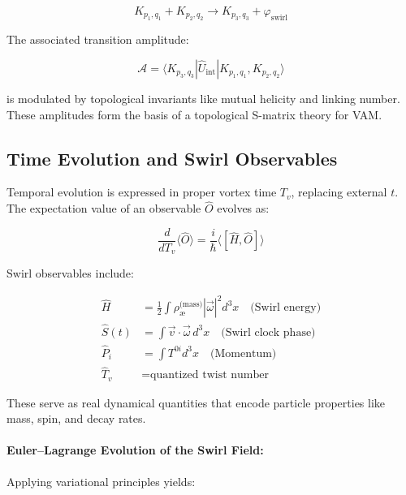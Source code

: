 \documentclass[preprint]{revtex4-2}
\begin{document}
    \begin{equation}
    K_{p_1,q_1} + K_{p_2,q_2} \rightarrow K_{p_3,q_3} + \varphi_{\text{swirl}}
    \end{equation}

    The associated transition amplitude:

    \begin{equation}
    \mathcal{A} = \langle K_{p_3,q_3} | \hat{U}_{\text{int}} | K_{p_1,q_1}, K_{p_2,q_2} \rangle
    \end{equation}

    is modulated by topological invariants like mutual helicity and linking number. These amplitudes form the basis of a topological S-matrix theory for VAM.

    \subsection{Time Evolution and Swirl Observables}

    Temporal evolution is expressed in proper vortex time \( T_v \), replacing external \( t \). The expectation value of an observable \( \hat{O} \) evolves as:

    \begin{equation}
    \frac{d}{dT_v} \langle \hat{O} \rangle = \frac{i}{\hbar} \langle [\hat{H}, \hat{O}] \rangle
    \end{equation}

    Swirl observables include:

    \begin{align}
    \hat{H} &= \frac{1}{2} \int \rho_{\text{\ae}}^{\text{(mass)}} |\vec{\omega}|^2 d^3x \quad \text{(Swirl energy)} \\
    \hat{S}(t) &= \int \vec{v} \cdot \vec{\omega} \, d^3x \quad \text{(Swirl clock phase)} \\
    \hat{P}_i &= \int T^{0i} d^3x \quad \text{(Momentum)} \\
    \hat{T}_v &= \text{quantized twist number}
    \end{align}

    These serve as real dynamical quantities that encode particle properties like mass, spin, and decay rates.

    \paragraph{Euler–Lagrange Evolution of the Swirl Field:}
    Applying variational principles yields:
\end{document}
